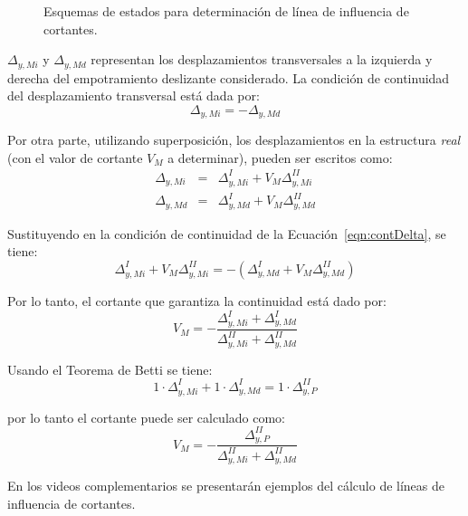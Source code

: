 \begin{figure}[htb]
	\centering
	\def\svgwidth{0.9\textwidth}
	
	\caption{Esquemas de estados para determinación de línea de influencia de cortantes.}
	\label{fig:ejemLIVM}
\end{figure}

$\Delta_{y,Mi}$ y $\Delta_{y,Md}$ representan los desplazamientos transversales a la izquierda y derecha del empotramiento deslizante considerado. %
%
La condición de continuidad del desplazamiento transversal está dada por:
%
\begin{equation}\label{eqn:contDelta}
\Delta_{y,Mi} = -\Delta_{y,Md}
\end{equation}

Por otra parte, utilizando superposición, los desplazamientos en la estructura \textit{real} (con el valor de cortante $V_M$ a determinar), pueden ser escritos como:
%
\begin{eqnarray}
\Delta_{y,Mi} &=& \Delta_{y,Mi}^I + V_M \Delta_{y,Mi}^{II} \\
\Delta_{y,Md} &=& \Delta_{y,Md}^I + V_M \Delta_{y,Md}^{II} 
\end{eqnarray}

Sustituyendo en la condición de continuidad de la Ecuación~\eqref{eqn:contDelta}, se tiene:
%
\begin{equation}
\Delta_{y,Mi}^I + V_M \Delta_{y,Mi}^{II} = - \left( \Delta_{y,Md}^I + V_M \Delta_{y,Md}^{II}  \right)
\end{equation}

Por lo tanto, el cortante que garantiza la continuidad está dado por:
%
\begin{equation}
V_M  =  - \frac{ \Delta_{y,Mi}^I + \Delta_{y,Md}^{I} } { \Delta_{y,Mi}^{II} + \Delta_{y,Md}^{II} } 
\end{equation}


Usando el Teorema de Betti se tiene:
\begin{equation}
1 \cdot \Delta_{y,Mi}^I + 1\cdot  \Delta_{y,Md}^{I} = 1\cdot  \Delta_{y,P}^{II} 
\end{equation}

por lo tanto el cortante puede ser calculado como:
%
\begin{equation}
\boxed{
V_M  =  - \frac{ \Delta_{y,P}^{II}  } { \Delta_{y,Mi}^{II} + \Delta_{y,Md}^{II} } 
}
\end{equation}

En los videos complementarios se presentarán ejemplos del cálculo de líneas de influencia de cortantes.

